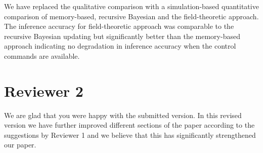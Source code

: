 \documentclass[a4paper,twoside,11pt]{reviewresponse}
\begin{document}
We have replaced the qualitative comparison with a simulation-based quantitative comparison of memory-based, recursive Bayesian and the field-theoretic approach. The inference accuracy for field-theoretic approach was comparable to the recursive Bayesian updating but significantly better than the memory-based approach indicating no degradation in inference accuracy when the control commands are available. 

\section{Reviewer 2}

We are glad that you were happy with the submitted version. In this revised version we have further improved different sections of the paper according to the suggestions by Reviewer 1 and we believe that this has significantly strengthened our paper. 


%
%
\end{document}
